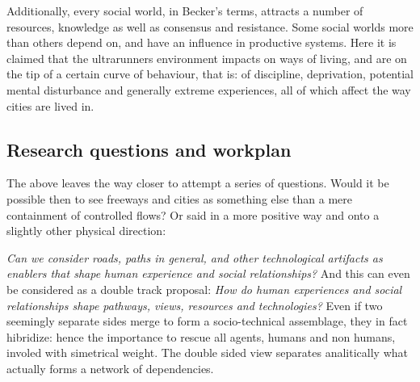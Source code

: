 Additionally, every social world, in Becker’s terms, attracts a number
of resources, knowledge as well as consensus and resistance. Some social worlds
more than others depend on, and have an influence in
productive systems. Here it is claimed that the ultrarunners environment impacts 
on ways of living, and are on the tip of a certain curve of behaviour, that
is: of discipline, deprivation, potential mental disturbance and generally extreme
experiences, all of which affect the way cities are lived in.

\subsection*{Research questions and workplan} 

The above leaves the way closer to attempt a series of questions.
Would it be possible then to see freeways and cities as something else than a mere containment of controlled flows?
Or said in a more positive way and onto a slightly other physical direction: \medskip
%

\textit{Can we consider roads, paths in general, and other technological artifacts as enablers that shape 
human experience and social relationships?} 
And this can even be considered as a double track proposal:
%
\textit{%
How do human experiences and social relationships %
shape pathways, views, resources and technologies?
}
Even if two seemingly separate sides merge to form a socio-technical assemblage, they in fact hibridize: 
hence the importance to rescue all agents, humans and non humans, involed with simetrical weight. 
The double sided view separates analitically what actually forms a network of dependencies.
\medskip

